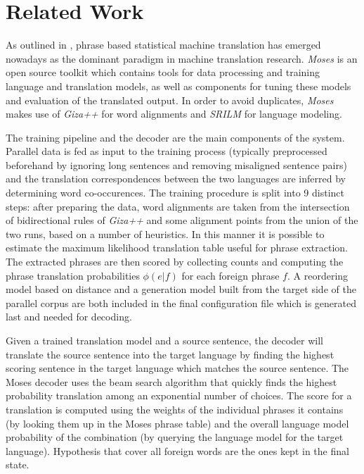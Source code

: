 \documentclass[11pt]{article}
\begin{document}
\section{Related Work}
\label{existing}
As outlined in \cite{moses}, phrase based statistical machine translation has emerged nowadays as the dominant paradigm in machine translation research. \textit{Moses} \cite{mosesurl} is an open source toolkit which contains tools for data processing and training language and translation models, as well as components for tuning these models and evaluation of the translated output. In order to avoid duplicates, \textit{Moses} makes use of \textit{Giza++} \cite{giza++} for word alignments and \textit{SRILM} \cite{srilm} for language modeling. 

The training pipeline and the decoder are the main components of the system. Parallel data is fed as input to the training process (typically preprocessed beforehand by ignoring long sentences and removing misaligned sentence pairs) and the translation correspondences between the two languages are inferred by determining word co-occurences. The training procedure is split into 9 distinct steps: after preparing the data, word alignments are taken from the intersection of bidirectional rules of \textit{Giza++} and some alignment points from the union of the two runs, based on a number of heuristics. In this manner it is possible to estimate the maximum likelihood translation table useful for phrase extraction. The extracted phrases are then scored by collecting counts and computing the phrase translation probabilities $\phi(e|f)$ for each foreign phrase $f$. A reordering model based on distance and a generation model built from the target side of the parallel corpus are both included in the final configuration file which is generated last and needed for decoding.

Given a trained translation model and a source sentence, the decoder will translate the source sentence into the target language by finding the highest scoring sentence in the target language which matches the source sentence. The Moses decoder uses the beam search algorithm that quickly finds the highest probability translation among an exponential number of choices. The score for a translation is computed using the weights of the individual phrases it contains (by looking them up in the Moses phrase table) and the overall language model probability of the combination (by querying the language model for the target language). Hypothesis that cover all foreign words are the ones kept in the final state.
\end{document}
